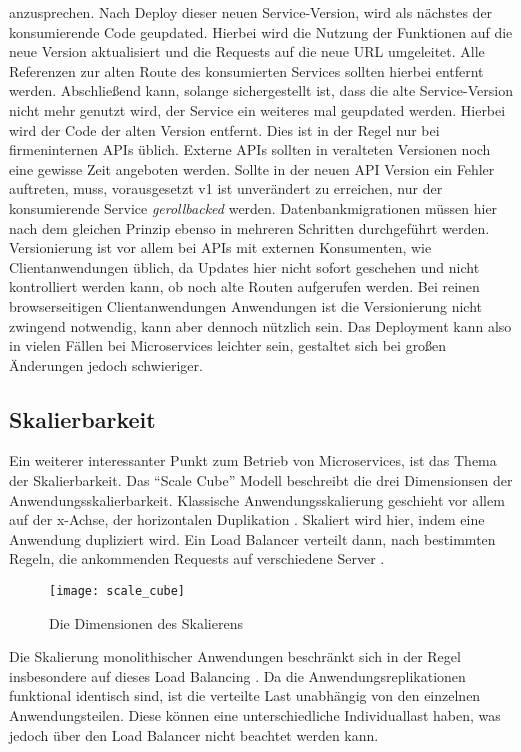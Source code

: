 \noindent anzusprechen. Nach Deploy dieser neuen Service-Version, wird als nächstes der konsumierende Code geupdated. Hierbei wird die Nutzung der Funktionen auf die neue Version aktualisiert und die Requests auf die neue URL umgeleitet. Alle Referenzen zur alten Route des konsumierten Services sollten hierbei entfernt werden. Abschließend kann, solange sichergestellt ist, dass die alte Service-Version nicht mehr genutzt wird, der Service ein weiteres mal geupdated werden. Hierbei wird der Code der alten Version entfernt. Dies ist in der Regel nur bei firmeninternen APIs üblich. Externe APIs sollten in veralteten Versionen noch eine gewisse Zeit angeboten werden. Sollte in der neuen API Version ein Fehler auftreten, muss, vorausgesetzt v1 ist unverändert zu erreichen, nur der konsumierende Service \textit{gerollbacked} werden.
Datenbankmigrationen müssen hier nach dem gleichen Prinzip ebenso in mehreren Schritten durchgeführt werden.
Versionierung ist vor allem bei APIs mit externen Konsumenten, wie Clientanwendungen üblich, da Updates hier nicht sofort geschehen und nicht kontrolliert werden kann, ob noch alte Routen aufgerufen werden. Bei reinen browserseitigen Clientanwendungen Anwendungen ist die Versionierung nicht zwingend notwendig, kann aber dennoch nützlich sein.
Das Deployment kann also in vielen Fällen bei Microservices leichter sein, gestaltet sich bei großen Änderungen jedoch schwieriger.

\subsection{Skalierbarkeit}
Ein weiterer interessanter Punkt zum Betrieb von Microservices, ist das Thema der Skalierbarkeit.
Das ``Scale Cube'' \cite[][]{abbott2009art} Modell beschreibt die drei Dimensionsen der Anwendungsskalierbarkeit. Klassische Anwendungsskalierung geschieht vor allem auf der x-Achse, der horizontalen Duplikation \cite[][]{abbott2009art}. Skaliert wird hier, indem eine Anwendung dupliziert wird. Ein Load Balancer verteilt dann, nach bestimmten Regeln, die ankommenden Requests auf verschiedene Server \cite[vgl.][]{loadbalancing}.

\begin{figure}[!ht]
    \caption{Die Dimensionen des Skalierens \cite{abbott2009art}}
    \label{fig:scalecube}
    \texttt{[image: scale\_cube]}
\end{figure}

Die Skalierung monolithischer Anwendungen beschränkt sich in der Regel insbesondere auf dieses Load Balancing \cite[vgl.][]{infaktuell}.
Da die Anwendungsreplikationen funktional identisch sind, ist die verteilte Last unabhängig von den einzelnen Anwendungsteilen. Diese können eine unterschiedliche Individuallast haben, was jedoch über den Load Balancer nicht beachtet werden kann.

